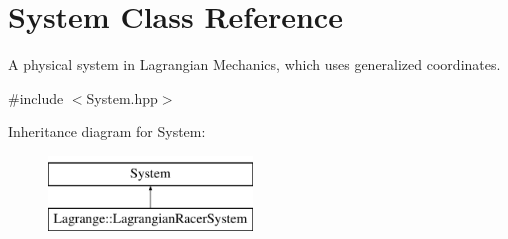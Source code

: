 \hypertarget{class_system}{\section{System Class Reference}
\label{class_system}
}


A physical system in Lagrangian Mechanics, which uses generalized coordinates.  




{\ttfamily \#include $<$System.\-hpp$>$}

Inheritance diagram for System\-:\begin{figure}[H]
\begin{center}
\leavevmode
\includegraphics[height=2.000000cm]{class_system}
\end{center}
\end{figure}
